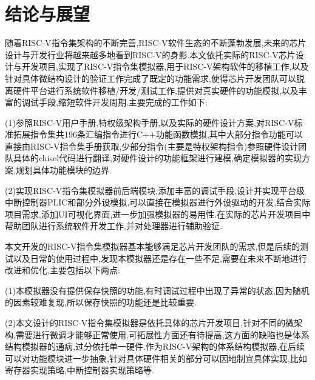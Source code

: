 
\chapter{结论与展望}
随着RISC-V指令集架构的不断完善,RISC-V软件生态的不断蓬勃发展,未来的芯片设计与开发行业将越来越多地看到RISC-V的身影.本文依托实际的RISC-V芯片设计与开发项目,实现了RISC-V指令集模拟器,用于RISC-V架构软件的移植工作,以及针对具体微结构设计的验证工作完成了既定的功能需求,使得芯片开发团队可以脱离硬件平台进行系统软件移植/开发/测试工作,提供对真实硬件的功能模拟,以及丰富的调试手段,缩短软件开发周期.主要完成的工作如下:


(1)参照RISC-V用户手册,特权级架构手册,以及实际的硬件设计方案,对RISC-V标准拓展指令集共196条汇编指令进行C++功能函数模拟,其中大部分指令功能可以直接由RISC-V指令集手册获取,少部分指令(主要是特权架构指令)参照硬件设计团队具体的chisel代码进行翻译,对硬件设计的功能框架进行建模,确定模拟器的实现方案,规划具体功能模块的边界.


(2)实现RISC-V指令集模拟器前后端模块,添加丰富的调试手段,设计并实现平台级中断控制器PLIC和部分外设模拟,可以直接在模拟器进行外设驱动的开发,结合实际项目需求,添加UI可视化界面,进一步加强模拟器的易用性.在实际的芯片开发项目中帮助团队进行系统软件开发工作,并对处理器进行辅助验证.


本文开发的RISC-V指令集模拟器基本能够满足芯片开发团队的需求,但是后续的测试以及日常的使用过程中,发现本模拟器还是存在一些不足,需要在未来不断地进行改进和优化,主要包括以下两点:


(1)本模拟器没有提供保存快照的功能,有时调试过程中出现了异常的状态,因为随机的因素较难复现,所以保存快照的功能还是比较重要.


(2)本文设计的RISC-V指令集模拟器是依托具体的芯片开发项目,针对不同的微架构,需要进行微调才能够正常使用,可拓展性方面还有待提高,这方面的缺陷也是体系结构模拟器的通病,过分依托单一硬件.作为RISC-V架构的体系结构模拟器,在后续可以对功能模块进一步抽象,针对具体硬件相关的部分可以因地制宜具体实现,比如寄存器实现策略,中断控制器实现策略等.

